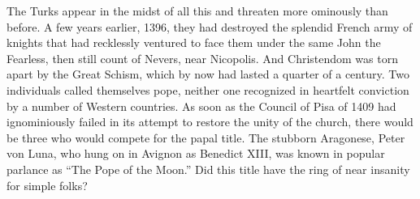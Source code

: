 The Turks appear in the midst of all this and threaten more ominously
than before. A few years earlier, 1396, they had destroyed the splendid
French army of knights that had recklessly ventured to face them under
the same John the Fearless, then still count of Nevers, near Nicopolis.
And Christendom was torn apart by the Great Schism, which by now had
lasted a quarter of a century. Two individuals called themselves pope,
neither one recognized in heartfelt conviction by a number of Western
countries. As soon as the Council of Pisa of 1409 had ignominiously
failed in its attempt to restore the unity of the church, there would be
three who would compete for the papal title. The stubborn Aragonese,
Peter von Luna, who hung on in Avignon as Benedict XIII, was known in
popular parlance as ``The Pope of the Moon.'' Did this title have the
ring of near insanity for simple folks?

